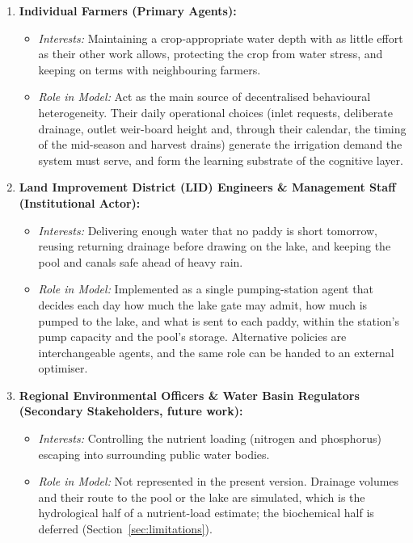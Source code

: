\documentclass{article}
\begin{document}
\begin{changed}
\begin{enumerate}
    \item \textbf{Individual Farmers (Primary Agents):}
    \begin{itemize}
        \item \emph{Interests:} Maintaining a crop-appropriate water depth with as little effort as their other work allows, protecting the crop from water stress, and keeping on terms with neighbouring farmers.
        \item \emph{Role in Model:} Act as the main source of decentralised behavioural heterogeneity. Their daily operational choices (inlet requests, deliberate drainage, outlet weir-board height and, through their calendar, the timing of the mid-season and harvest drains) generate the irrigation demand the system must serve, and form the learning substrate of the cognitive layer.
    \end{itemize}

    \item \textbf{Land Improvement District (LID) Engineers \& Management Staff (Institutional Actor):}
    \begin{itemize}
        \item \emph{Interests:} Delivering enough water that no paddy is short tomorrow, reusing returning drainage before drawing on the lake, and keeping the pool and canals safe ahead of heavy rain.
        \item \emph{Role in Model:} Implemented as a single pumping-station agent that decides each day how much the lake gate may admit, how much is pumped to the lake, and what is sent to each paddy, within the station's pump capacity and the pool's storage. Alternative policies are interchangeable agents, and the same role can be handed to an external optimiser.
    \end{itemize}

    \item \textbf{Regional Environmental Officers \& Water Basin Regulators (Secondary Stakeholders, future work):}
    \begin{itemize}
        \item \emph{Interests:} Controlling the nutrient loading (nitrogen and phosphorus) escaping into surrounding public water bodies.
        \item \emph{Role in Model:} Not represented in the present version. Drainage volumes and their route to the pool or the lake are simulated, which is the hydrological half of a nutrient-load estimate; the biochemical half is deferred (Section~\ref{sec:limitations}).
    \end{itemize}
\end{enumerate}
\end{changed}
\end{document}
